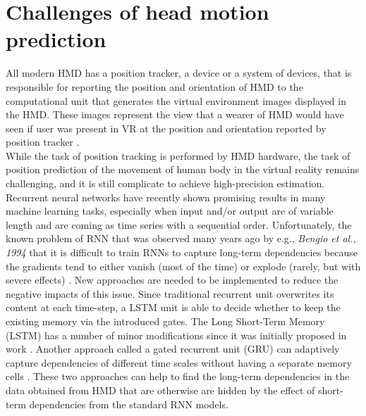 \section{Challenges of head motion prediction}
\label{sec:theorie:head_pred}
All modern HMD has a position tracker, a device or a system of devices, that is responsible for reporting  the position and orientation of HMD to the computational unit that generates the virtual environment images displayed in the HMD. These images represent the view that a wearer of HMD would have seen if user was present in VR at the position and orientation reported by position tracker \cite{hmd}.\\
While the task of position tracking is performed by HMD hardware, the task of position prediction of the movement of human body in the virtual reality remains challenging, and it is still complicate to achieve high-precision estimation. Recurrent neural networks have recently shown promising results in many machine learning tasks, especially when input and/or output are of variable length and are coming as time series with a sequential order.  Unfortunately, the known problem of RNN that was observed many years ago by e.g., \textit{Bengio et al., 1994} that it is difficult to train RNNs to capture long-term dependencies because the gradients tend to either vanish (most of the time) or explode (rarely, but with severe effects) \cite{rnn_difficults}. New approaches are needed to be implemented to reduce the negative impacts of this issue. Since traditional recurrent unit overwrites its content at each time-step, a LSTM unit is able to decide whether to keep the existing memory via the introduced gates. The Long Short-Term Memory (LSTM) has a number of minor modifications \cite{empirical_evaluation} since it was initially proposed in work \cite{lstm_orig}. Another approach called a gated recurrent unit (GRU) can adaptively capture dependencies of different time scales without having a separate memory cells \cite{empirical_evaluation}. These two approaches can help to find the long-term dependencies in the data obtained from HMD that are otherwise are hidden by the effect of short-term dependencies from the standard RNN models.\\
